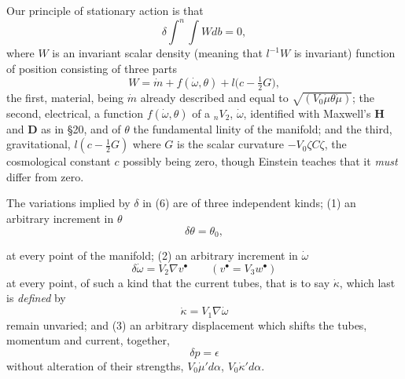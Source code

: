 \documentclass[11pt]{article}
\begin{document}
\indent Our principle of stationary action is that
\begin{equation}
  \delta\int^n\!\int Wdb=0,
  \tag{6}
\end{equation}
where $W$ is an invariant scalar density (meaning that $l^{-1}W$ is invariant) function of position consisting of three parts
\begin{equation}
  W=\dot m+f(\dot\omega,\theta)+l\bigl(c-\tfrac12G\bigr),
  \tag{7}
\end{equation}
the first, material, being $\dot m$ already described and equal to $\sqrt{(V_0\dot\mu\theta\dot\mu)}$; the second, electrical, a function $f(\dot\omega,\theta)$ of a ${}_nV_2$, $\dot\omega$, identified with Maxwell's $\mathbf{H}$ and $\mathbf{D}$ as in §20, and of $\theta$ the fundamental linity of the manifold; and the third, gravitational, $l(c-\tfrac12G)$ where $G$ is the scalar curvature $-V_0\zeta C\zeta$, the cosmological constant $c$ possibly being zero, though Einstein teaches that it \emph{must} differ from zero.

\indent The variations implied by $\delta$ in (6) are of three independent kinds; (1) an arbitrary increment in $\theta$
\begin{equation}
  \delta\theta=\theta_0,
  \tag{8}
\end{equation}

at every point of the manifold; (2) an arbitrary increment in $\dot\omega$
\begin{equation}
  \delta\dot\omega=V_2\nabla v^\bullet\qquad(v^\bullet=V_3w^\bullet)
  \tag{9}
\end{equation}
at every point, of such a kind that the current tubes, that is to say $\dot\kappa$, which last is \emph{defined} by
\begin{equation}
  \dot\kappa=V_1\nabla\dot\omega
  \tag{10}
\end{equation}
remain unvaried; and (3) an arbitrary displacement which shifts the tubes, momentum and current, together,
\begin{equation}
  \delta p=\epsilon
  \tag{11}
\end{equation}
without alteration of their strengths, $V_0\dot\mu'd\alpha$, $V_0\dot\kappa'd\alpha$.

\indent [\emph{Added October, 1921.}---A consequence of remarks which occur below is so obvious that it is singular that only now have I happened to recognise it. If it is assumed that for the first two variations $(\delta\theta=\theta_0$ and $\delta\dot\omega=V_2\nabla v^\bullet)$ the stationary condition (6) holds; then \emph{it follows as a mathematical deduction} that the stationary condition also holds for the third variation $(\delta p=\epsilon)$ which shifts the tubes. Clearly then our postulated principle of stationary action should not include the \emph{assumption} of the stationary condition for the third variation. The reader will easily justify the assertions that have just been made, if he will take as the proof of the equation $T_{\xi}^{(t)}\zeta=0$, the indication of a proof, immediately following the identity (35) below. This equation $T_{\xi}^{(t)}\zeta=0$ is virtually the necessary and sufficient condition for the existence of the stationary condition under the variation $\delta p=\epsilon$.]
\end{document}
